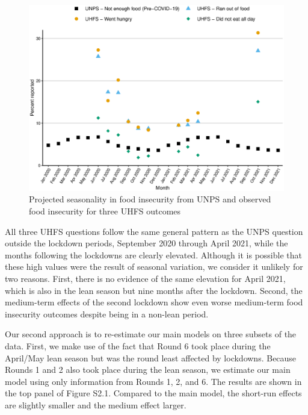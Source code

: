 \documentclass{wber}
\begin{document}
\begin{figure}
\caption{Projected seasonality in food insecurity from UNPS and observed
food insecurity for three UHFS outcomes}\label{fig:seasonality}
\begin{center}
\includegraphics[width=\linewidth, keepaspectratio]{./eps/fig_04.eps}
\end{center}
\end{figure}


All three UHFS questions follow the same general pattern as the UNPS
question outside the lockdown periods, September 2020 through April
2021, while the months following the lockdowns are clearly elevated.
Although it is possible that these high values were the result of
seasonal variation, we consider it unlikely for two reasons. First,
there is no evidence of the same elevation for April 2021, which is also
in the lean season but nine months after the lockdown. Second, the
medium-term effects of the second lockdown show even worse medium-term
food insecurity outcomes despite being in a non-lean period.

Our second approach is to re-estimate our main models on three subsets
of the data. First, we make use of the fact that Round 6 took place
during the April/May lean season but was the round least affected by
lockdowns. Because Rounds 1 and 2 also took place during the lean
season, we estimate our main model using only information from Rounds 1,
2, and 6. The results are shown in the top panel of Figure S2.1. 
Compared to the main model, the short-run effects are slightly smaller 
and the medium effect larger.
\end{document}
